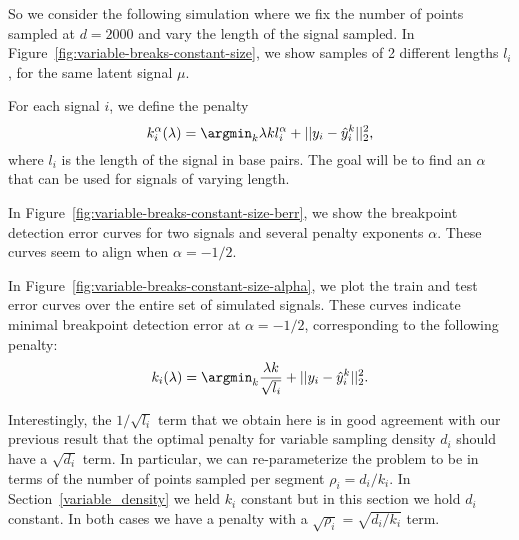 \documentclass{article}
\begin{document}
So we consider the following simulation where we fix the number of
points sampled at $d=2000$ and vary the length of the signal
sampled. In Figure~\ref{fig:variable-breaks-constant-size}, we show
samples of 2 different lengths $l_i$, for the same latent signal
$\mu$.


\newpage

For each signal $i$, we define the penalty
\begin{equation}
  \label{eq:kstar_length}
  k_i^\alpha(\lambda) = \argmin_k \lambda k l_i^\alpha 
+ ||y_i - \hat y_i^k||^2_2,
\end{equation}
where $l_i$ is the length of the signal in base pairs. The goal will
be to find an $\alpha$ that can be used for signals of varying length.


In Figure~\ref{fig:variable-breaks-constant-size-berr}, we show
the breakpoint detection error curves for two signals and several
penalty exponents $\alpha$.
These curves seem to align when $\alpha=-1/2$.


\newpage

In Figure~\ref{fig:variable-breaks-constant-size-alpha}, we plot the
train and test error curves over the entire set of simulated signals.
These curves indicate minimal breakpoint detection error at
$\alpha=-1/2$, corresponding to the following penalty:
\begin{equation}
  \label{eq:kstar_length_opt}
  k_i(\lambda) = \argmin_k \frac{\lambda k}{\sqrt{l_i}}
  + ||y_i-\hat y_i^k||^2_2.
\end{equation}





\newpage

Interestingly, the $1/\sqrt{l_i}$ term that we obtain here is in good
agreement with our previous result that the optimal penalty for
variable sampling density $d_i$ should have a $\sqrt{d_i}$ term. In
particular, we can re-parameterize the problem to be in terms of the
number of points sampled per segment $\rho_i=d_i/k_i$. In
Section~\ref{variable_density} we held $k_i$ constant but in this
section we hold $d_i$ constant. In both cases we have a penalty with a
$\sqrt{\rho_i}=\sqrt{d_i/k_i}$ term.
\end{document}
